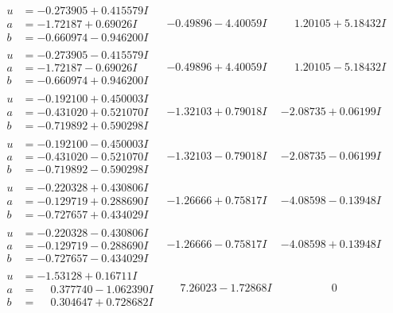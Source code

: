 \documentclass[1p]{elsarticle_modified}
\theoremstyle{definition}
\begin{document}
$$\begin{array}{c|c|c}
\begin{aligned}
u &= -0.273905 + 0.415579 I \\
a &= -1.72187 + 0.69026 I \\
b &= -0.660974 - 0.946200 I\end{aligned}
 & -0.49896 - 4.40059 I & \phantom{-}1.20105 + 5.18432 I \\ \hline\begin{aligned}
u &= -0.273905 - 0.415579 I \\
a &= -1.72187 - 0.69026 I \\
b &= -0.660974 + 0.946200 I\end{aligned}
 & -0.49896 + 4.40059 I & \phantom{-}1.20105 - 5.18432 I \\ \hline\begin{aligned}
u &= -0.192100 + 0.450003 I \\
a &= -0.431020 + 0.521070 I \\
b &= -0.719892 + 0.590298 I\end{aligned}
 & -1.32103 + 0.79018 I & -2.08735 + 0.06199 I \\ \hline\begin{aligned}
u &= -0.192100 - 0.450003 I \\
a &= -0.431020 - 0.521070 I \\
b &= -0.719892 - 0.590298 I\end{aligned}
 & -1.32103 - 0.79018 I & -2.08735 - 0.06199 I \\ \hline\begin{aligned}
u &= -0.220328 + 0.430806 I \\
a &= -0.129719 + 0.288690 I \\
b &= -0.727657 + 0.434029 I\end{aligned}
 & -1.26666 + 0.75817 I & -4.08598 - 0.13948 I \\ \hline\begin{aligned}
u &= -0.220328 - 0.430806 I \\
a &= -0.129719 - 0.288690 I \\
b &= -0.727657 - 0.434029 I\end{aligned}
 & -1.26666 - 0.75817 I & -4.08598 + 0.13948 I \\ \hline\begin{aligned}
u &= -1.53128 + 0.16711 I \\
a &= \phantom{-}0.377740 - 1.062390 I \\
b &= \phantom{-}0.304647 + 0.728682 I\end{aligned}
 & \phantom{-}7.26023 - 1.72868 I & \phantom{-0.000000 } 0\\

\end{array}$$
\end{document}
